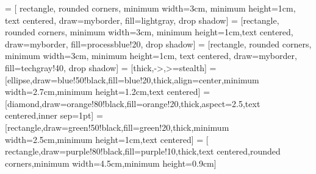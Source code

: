  = [ rectangle, rounded corners, minimum width=3cm, minimum height=1cm, text centered, draw=myborder, fill=lightgray, drop shadow]
 = [rectangle, rounded corners, minimum width=3cm, minimum height=1cm,text centered, draw=myborder, fill=processblue!20, drop shadow]
 = [rectangle, rounded corners, minimum width=3cm, minimum height=1cm, text centered, draw=myborder, fill=techgray!40, drop shadow]
 = [thick,->,>=stealth]
 = [ellipse,draw=blue!50!black,fill=blue!20,thick,align=center,minimum width=2.7cm,minimum height=1.2cm,text centered]
 = [diamond,draw=orange!80!black,fill=orange!20,thick,aspect=2.5,text centered,inner sep=1pt]
 = [rectangle,draw=green!50!black,fill=green!20,thick,minimum width=2.5cm,minimum height=1cm,text centered]
 = [ rectangle,draw=purple!80!black,fill=purple!10,thick,text centered,rounded corners,minimum width=4.5cm,minimum height=0.9cm]
